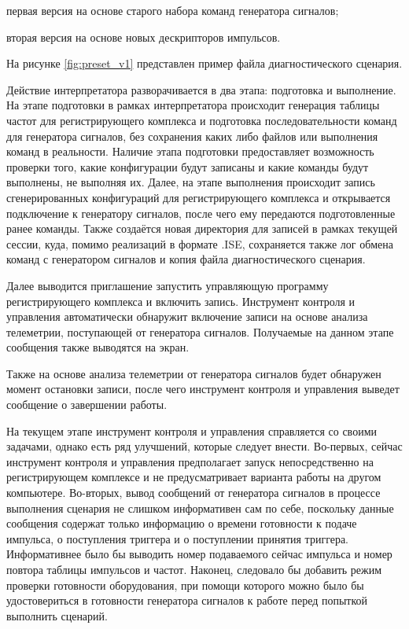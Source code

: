 \documentclass{report}
\begin{document}
\begin{enummarker}
    \item первая версия на основе старого набора команд генератора сигналов;
    \item вторая версия на основе новых дескрипторов импульсов.
\end{enummarker}

На рисунке \ref{fig:preset_v1} представлен пример файла диагностического сценария.


Действие интерпретатора разворачивается в два этапа: подготовка и выполнение. На этапе подготовки в рамках интерпретатора происходит генерация таблицы частот для регистрирующего комплекса и подготовка последовательности команд для генератора сигналов, без сохранения каких либо файлов или выполнения команд в реальности. Наличие этапа подготовки предоставляет возможность проверки того, какие конфигурации будут записаны и какие команды будут выполнены, не выполняя их. Далее, на этапе выполнения происходит запись сгенерированных конфигураций для регистрирующего комплекса и открывается подключение к генератору сигналов, после чего ему передаются подготовленные ранее команды. Также создаётся новая директория для записей в рамках текущей сессии, куда, помимо реализаций в формате .ISE, сохраняется также лог обмена команд с генератором сигналов и копия файла диагностического сценария.

Далее выводится приглашение запустить управляющую программу регистрирующего комплекса и включить запись. Инструмент контроля и управления автоматически обнаружит включение записи на основе анализа телеметрии, поступающей от генератора сигналов. Получаемые на данном этапе сообщения также выводятся на экран.

Также на основе анализа телеметрии от генератора сигналов будет обнаружен момент остановки записи, после чего инструмент контроля и управления выведет сообщение о завершении работы.

На текущем этапе инструмент контроля и управления справляется со своими задачами, однако есть ряд улучшений, которые следует внести. Во-первых, сейчас инструмент контроля и управления предполагает запуск непосредственно на регистрирующем комплексе и не предусматривает варианта работы на другом компьютере. Во-вторых, вывод сообщений от генератора сигналов в процессе выполнения сценария не слишком информативен сам по себе, поскольку данные сообщения содержат только информацию о времени готовности к подаче импульса, о поступления триггера и о поступлении принятия триггера. Информативнее было бы выводить номер подаваемого сейчас импульса и номер повтора таблицы импульсов и частот. Наконец, следовало бы добавить режим проверки готовности оборудования, при помощи которого можно было бы удостовериться в готовности генератора сигналов к работе перед попыткой выполнить сценарий.
\end{document}
